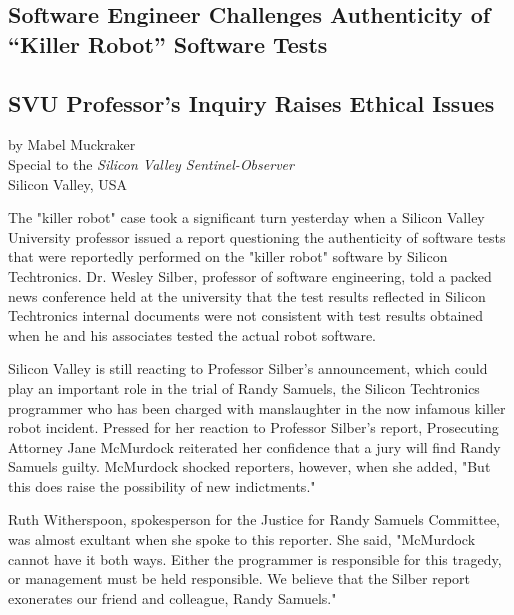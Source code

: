 \begin{center}
\section*{Software Engineer Challenges Authenticity of ``Killer Robot'' Software Tests}
\subsection*{SVU Professor's Inquiry Raises Ethical Issues}
by Mabel Muckraker\\
Special to the \textit{Silicon Valley Sentinel-Observer}\\
Silicon Valley, USA
\end{center}

The "killer robot" case took a significant turn yesterday when a Silicon Valley University professor issued a report questioning the authenticity of software tests that were reportedly performed on the "killer robot" software by Silicon Techtronics. Dr. Wesley Silber, professor of software engineering, told a packed news conference held at the university that the test results reflected in Silicon Techtronics internal documents were not consistent with test results obtained when he and his associates tested the actual robot software.

Silicon Valley is still reacting to Professor Silber's announcement, which could play an important role in the trial of Randy Samuels, the Silicon Techtronics programmer who has been charged with manslaughter in the now infamous killer robot incident. Pressed for her reaction to Professor Silber's report, Prosecuting Attorney Jane McMurdock reiterated her confidence that a jury will find Randy Samuels guilty. McMurdock shocked reporters, however, when she added, "But this does raise the possibility of new indictments."

Ruth Witherspoon, spokesperson for the Justice for Randy Samuels Committee, was almost exultant when she spoke to this reporter. She said, "McMurdock cannot have it both ways. Either the programmer is responsible for this tragedy, or management must be held responsible. We believe that the Silber report exonerates our friend and colleague, Randy Samuels."

